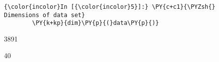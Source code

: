    \begin{Verbatim}[commandchars=\\\{\}]
{\color{incolor}In [{\color{incolor}5}]:} \PY{c+c1}{\PYZsh{} Dimensions of data set}
        \PY{k+kp}{dim}\PY{p}{(}data\PY{p}{)}
\end{Verbatim}


    \begin{enumerate*}
\item 3891
\item 40
\end{enumerate*}
